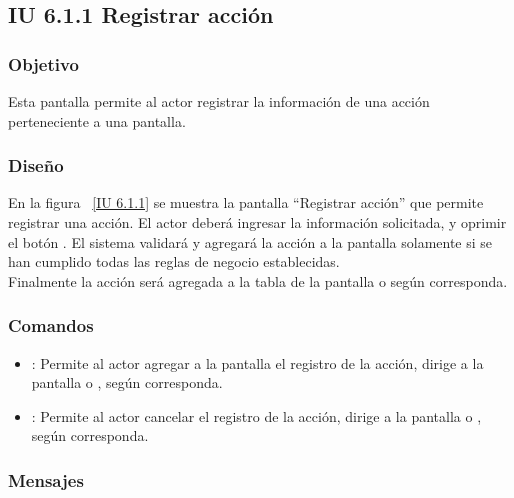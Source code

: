 \newpage 
\subsection{IU 6.1.1 Registrar acción}

\subsubsection{Objetivo}
	
	Esta pantalla permite al actor registrar la información de una acción perteneciente a una pantalla.

\subsubsection{Diseño}

    En la figura ~\ref{IU 6.1.1} se muestra la pantalla ``Registrar acción'' que permite registrar una acción. El actor deberá ingresar la información solicitada,
    y oprimir el botón . El sistema validará y agregará la acción a la pantalla solamente si se han cumplido todas las reglas de negocio establecidas.  \\
    
    Finalmente la acción será agregada a la tabla de la pantalla  o  según corresponda. \\



\subsubsection{Comandos}
\begin{itemize}
	\item {}: Permite al actor agregar a la pantalla el registro de la acción, dirige a la pantalla  o , según corresponda.
	\item {}: Permite al actor cancelar el registro de la acción, dirige a la pantalla  o , según corresponda.
\end{itemize}

\subsubsection{Mensajes}


